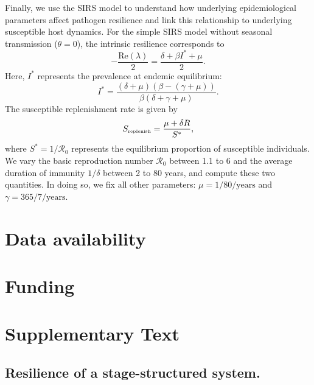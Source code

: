 \documentclass[12pt]{article}
\newcommand{\tsub}[2]{#1_{{\textrm{\tiny #2}}}}
\begin{document}
Finally, we use the SIRS model to understand how underlying epidemiological parameters affect pathogen resilience and link this relationship to underlying susceptible host dynamics.
For the simple SIRS model without seasonal transmission ($\theta = 0$), the intrinsic resilience corresponds to
\begin{equation}
-\frac{\mathrm{Re}(\lambda)}{2} = \frac{\delta + \beta I^{\ast} + \mu}{2}.
\end{equation}
Here, $I^{\ast}$ represents the prevalence at endemic equilibrium:
\begin{equation}
I^{\ast} = \frac{(\delta + \mu)(\beta - (\gamma + \mu))}{\beta(\delta + \gamma + \mu)}.
\end{equation}
The susceptible replenishment rate is given by
\begin{equation}
\tsub{S}{replenish} = \frac{\mu + \delta R}{S^\ast},
\end{equation}
where $S^\ast = 1/\mathcal R_0$ represents the equilibrium proportion of susceptible individuals.
We vary the basic reproduction number $\mathcal R_0$ between 1.1 to 6 and the average duration of immunity $1/\delta$ between 2 to 80 years, and compute these two quantities.
In doing so, we fix all other parameters: $\mu=1/80/\mathrm{years}$ and $\gamma=365/7/\mathrm{years}$.

\section*{Data availability}

\section*{Funding}

\pagebreak

\setcounter{figure}{0}
\setcounter{equation}{0}
\renewcommand{\thefigure}{S\arabic{figure}}
\renewcommand{\theequation}{S\arabic{equation}}

\section*{Supplementary Text}

\subsection*{Resilience of a stage-structured system.}
\end{document}
